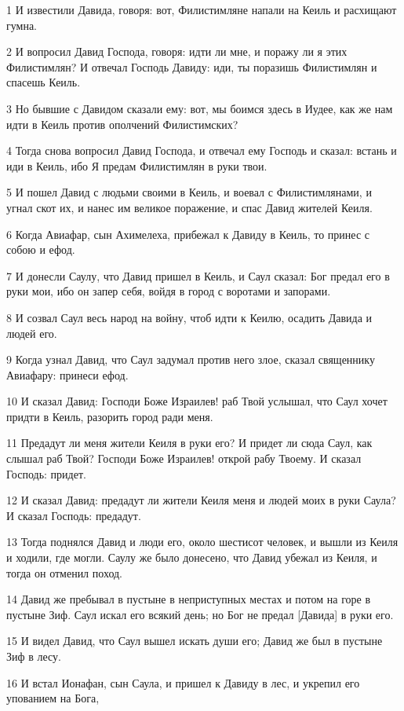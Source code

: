 \par 1 И известили Давида, говоря: вот, Филистимляне напали на Кеиль и расхищают гумна.
\par 2 И вопросил Давид Господа, говоря: идти ли мне, и поражу ли я этих Филистимлян? И отвечал Господь Давиду: иди, ты поразишь Филистимлян и спасешь Кеиль.
\par 3 Но бывшие с Давидом сказали ему: вот, мы боимся здесь в Иудее, как же нам идти в Кеиль против ополчений Филистимских?
\par 4 Тогда снова вопросил Давид Господа, и отвечал ему Господь и сказал: встань и иди в Кеиль, ибо Я предам Филистимлян в руки твои.
\par 5 И пошел Давид с людьми своими в Кеиль, и воевал с Филистимлянами, и угнал скот их, и нанес им великое поражение, и спас Давид жителей Кеиля.
\par 6 Когда Авиафар, сын Ахимелеха, прибежал к Давиду в Кеиль, то принес с собою и ефод.
\par 7 И донесли Саулу, что Давид пришел в Кеиль, и Саул сказал: Бог предал его в руки мои, ибо он запер себя, войдя в город с воротами и запорами.
\par 8 И созвал Саул весь народ на войну, чтоб идти к Кеилю, осадить Давида и людей его.
\par 9 Когда узнал Давид, что Саул задумал против него злое, сказал священнику Авиафару: принеси ефод.
\par 10 И сказал Давид: Господи Боже Израилев! раб Твой услышал, что Саул хочет придти в Кеиль, разорить город ради меня.
\par 11 Предадут ли меня жители Кеиля в руки его? И придет ли сюда Саул, как слышал раб Твой? Господи Боже Израилев! открой рабу Твоему. И сказал Господь: придет.
\par 12 И сказал Давид: предадут ли жители Кеиля меня и людей моих в руки Саула? И сказал Господь: предадут.
\par 13 Тогда поднялся Давид и люди его, около шестисот человек, и вышли из Кеиля и ходили, где могли. Саулу же было донесено, что Давид убежал из Кеиля, и тогда он отменил поход.
\par 14 Давид же пребывал в пустыне в неприступных местах и потом на горе в пустыне Зиф. Саул искал его всякий день; но Бог не предал [Давида] в руки его.
\par 15 И видел Давид, что Саул вышел искать души его; Давид же был в пустыне Зиф в лесу.
\par 16 И встал Ионафан, сын Саула, и пришел к Давиду в лес, и укрепил его упованием на Бога,
